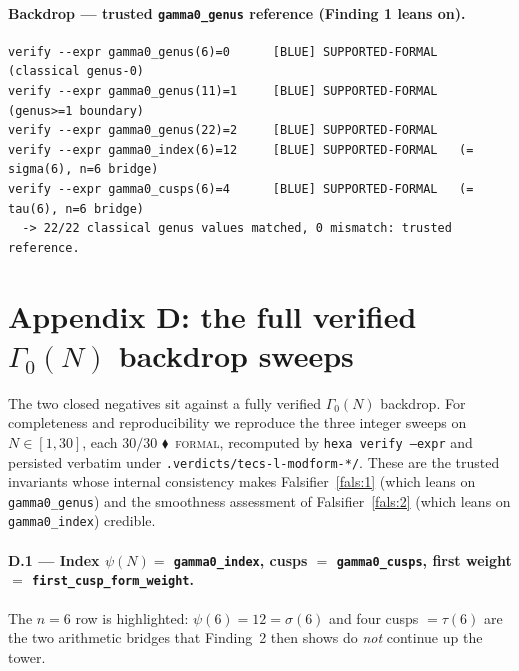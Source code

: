 \documentclass[11pt,a4paper]{article}
\newcommand{\tierF}{\textcolor{blue!60!black}{$\blacklozenge$}}   %
\newcommand{\sig}{\sigma}
\newcommand{\Gz}{\Gamma_0}
\theoremstyle{definition}
\begin{document}
\paragraph{Backdrop --- trusted \texttt{gamma0\_genus} reference (Finding 1 leans on).}
\begin{verbatim}
verify --expr gamma0_genus(6)=0      [BLUE] SUPPORTED-FORMAL   (classical genus-0)
verify --expr gamma0_genus(11)=1     [BLUE] SUPPORTED-FORMAL   (genus>=1 boundary)
verify --expr gamma0_genus(22)=2     [BLUE] SUPPORTED-FORMAL
verify --expr gamma0_index(6)=12     [BLUE] SUPPORTED-FORMAL   (= sigma(6), n=6 bridge)
verify --expr gamma0_cusps(6)=4      [BLUE] SUPPORTED-FORMAL   (= tau(6), n=6 bridge)
  -> 22/22 classical genus values matched, 0 mismatch: trusted reference.
\end{verbatim}

\section{Appendix D: the full verified $\Gz(N)$ backdrop sweeps}
\label{app:backdrop}

The two closed negatives sit against a fully verified $\Gz(N)$ backdrop. For
completeness and reproducibility we reproduce the three integer sweeps on
$N\in[1,30]$, each $30/30$ \tierF\ \textsc{formal}, recomputed by \texttt{hexa
verify --expr} and persisted verbatim under \texttt{.verdicts/tecs-l-modform-*/}.
These are the trusted invariants whose internal consistency makes
Falsifier~\ref{fals:1} (which leans on \texttt{gamma0\_genus}) and the
smoothness assessment of Falsifier~\ref{fals:2} (which leans on
\texttt{gamma0\_index}) credible.

\paragraph{D.1 --- Index $\psi(N) =$ \texttt{gamma0\_index}, cusps $=$
\texttt{gamma0\_cusps}, first weight $=$ \texttt{first\_cusp\_form\_weight}.}
The $n=6$ row is highlighted: $\psi(6)=12=\sig(6)$ and four cusps $=\tau(6)$ are
the two arithmetic bridges that Finding~2 then shows do \emph{not} continue up
the tower.
\end{document}
